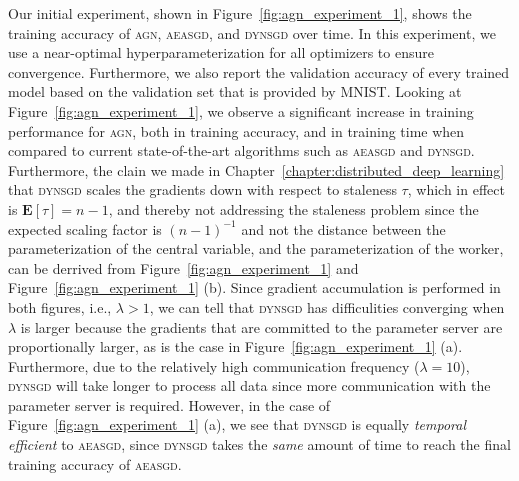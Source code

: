 Our initial experiment, shown in Figure~\ref{fig:agn_experiment_1}, shows the training accuracy of \textsc{agn}, \textsc{aeasgd}, and \textsc{dynsgd} over time. In this experiment, we use a near-optimal hyperparameterization for all optimizers to ensure convergence. Furthermore, we also report the validation accuracy of every trained model based on the validation set that is provided by MNIST. Looking at Figure~\ref{fig:agn_experiment_1}, we observe a significant increase in training performance for \textsc{agn}, both in training accuracy, and in training time when compared to current state-of-the-art algorithms such as \textsc{aeasgd} and \textsc{dynsgd}. Furthermore, the clain we made in Chapter~\ref{chapter:distributed_deep_learning} that \textsc{dynsgd} scales the gradients down with respect to staleness $\tau$, which in effect is $\textbf{E}[\tau] = n - 1$, and thereby not addressing the staleness problem since the expected scaling factor is $(n - 1)^{-1}$ and not the distance between the parameterization of the central variable, and the parameterization of the worker, can be derrived from Figure~\ref{fig:agn_experiment_1} and Figure~\ref{fig:agn_experiment_1} (b). Since gradient accumulation is performed in both figures, i.e., $\lambda > 1$, we can tell that \textsc{dynsgd} has difficulities converging when $\lambda$ is larger because the gradients that are committed to the parameter server are proportionally larger, as is the case in Figure~\ref{fig:agn_experiment_1} (a). Furthermore, due to the relatively high communication frequency ($\lambda = 10$), \textsc{dynsgd} will take longer to process all data since more communication with the parameter server is required. However, in the case of Figure~\ref{fig:agn_experiment_1} (a), we see that \textsc{dynsgd} is equally \emph{temporal efficient} to \textsc{aeasgd}, since \textsc{dynsgd} takes the \emph{same} amount of time to reach the final training accuracy of \textsc{aeasgd}.

